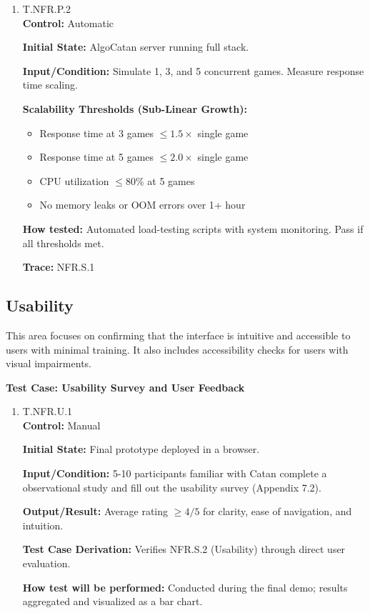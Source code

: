 \documentclass[12pt, titlepage]{article}
\begin{document}
\begin{enumerate}
\item{\hypertarget{T.NFR.P.2}{T.NFR.P.2}\\}
\textbf{Control:} Automatic

\textbf{Initial State:} AlgoCatan server running full stack.

\textbf{Input/Condition:} Simulate 1, 3, and 5 concurrent games.
Measure response time scaling.

\textbf{Scalability Thresholds (Sub-Linear Growth):}
\begin{itemize}
    \item Response time at 3 games $\leq 1.5 \times$ single game
    \item Response time at 5 games $\leq 2.0 \times$ single game
    \item CPU utilization $\leq 80\%$ at 5 games
    \item No memory leaks or OOM errors over 1+ hour
\end{itemize}

\textbf{How tested:} Automated load-testing scripts with system monitoring.
Pass if all thresholds met.

\textbf{Trace:} NFR.S.1
\end{enumerate}

\subsection{Usability}

This area focuses on confirming that the interface is intuitive and accessible to users with minimal training. It also includes accessibility checks for users with visual impairments.

\textbf{Test Case: Usability Survey and User Feedback}

\begin{enumerate}
\item{\hypertarget{T.NFR.U.1}{T.NFR.U.1}\\}
\textbf{Control:} Manual

\textbf{Initial State:} Final prototype deployed in a browser.

\textbf{Input/Condition:} 5-10 participants familiar with Catan complete a observational study and fill out the usability survey (Appendix 7.2).

\textbf{Output/Result:} Average rating $\geq 4/5$ for clarity, ease of navigation, and intuition.

\textbf{Test Case Derivation:} Verifies NFR.S.2 (Usability) through direct user evaluation.

\textbf{How test will be performed:} Conducted during the final demo; results aggregated and visualized as a bar chart.
\end{enumerate}
\end{document}
